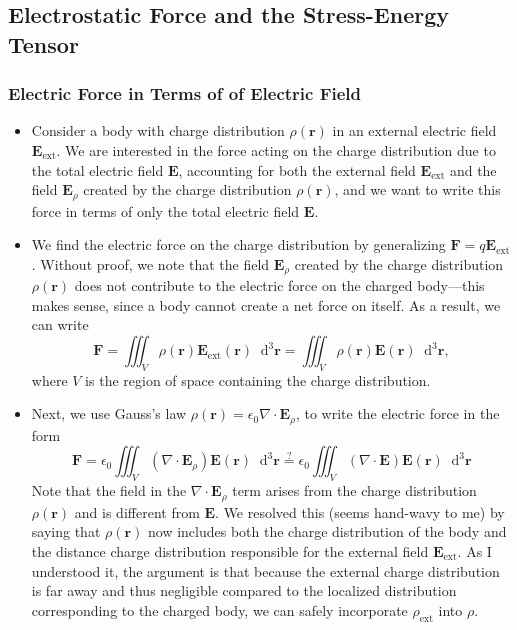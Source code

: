 \documentclass[11pt, a4paper]{article}
\newcommand{\diff}{\mathop{}\!\mathrm{d}} %
\newcommand{\dr}{\diff^{3} \r}  %
\renewcommand{\vec}[1]{\bm{#1}} %
\renewcommand{\r}{\vec{r}}
\newcommand{\E}{\vec{E}} %
\newcommand{\ee}{\epsilon_{0}}  %
\renewcommand{\div}{\nabla \cdot}
\begin{document}
\subsection{Electrostatic Force and the Stress-Energy Tensor}

\subsubsection{Electric Force in Terms of of Electric Field}
\begin{itemize}
	\item Consider a body with charge distribution $ \rho(\r) $ in an external electric field $ \E_{\text{ext}} $. We are interested in the force acting on the charge distribution due to the total electric field $ \E $, accounting for both the external field $ \E_{\text{ext}} $ and the field $ \E_{\rho} $ created by the charge distribution $ \rho(\r) $, and we want to write this force in terms of only the total electric field $ \E $.
	
	\item We find the electric force on the charge distribution by generalizing $ \vec{F} = q \E_{\text{ext}} $. Without proof, we note that the field $ \E_{\rho} $ created by the charge distribution $ \rho(\r) $ does not contribute to the electric force on the charged body---this makes sense, since a body cannot create a net force on itself. As a result, we can write
	\begin{equation*}
		\vec{F} = \iiint_{V} \rho(\r) \E_{\text{ext}}(\r) \dr = \iiint_{V} \rho(\r) \E(\r) \dr,
	\end{equation*}
	where $ V $ is the region of space containing the charge distribution.
	
	\item Next, we use Gauss's law $ \rho(\r) = \ee \div \E_{\rho} $, to write the electric force in the form
	\begin{equation*}
		\vec{F} = \ee \iiint_{V} (\div \E_{\rho}) \E(\r) \dr \stackrel{?}{=} \ee \iiint_{V} (\div \E) \E(\r) \dr 
	\end{equation*}
	Note that the field in the $ \div \E_{\rho} $ term arises from the charge distribution $ \rho(\r) $ and is different from $ \E $. We resolved this (seems hand-wavy to me) by saying that $ \rho(\r) $ now includes both the charge distribution of the body and the distance charge distribution responsible for the external field $ \E_{\text{ext}} $. As I understood it, the argument is that because the external charge distribution is far away and thus negligible compared to the localized distribution corresponding to the charged body, we can safely incorporate $ \rho_{\text{ext}} $ into $ \rho $. 
	

\end{itemize}
\end{document}
